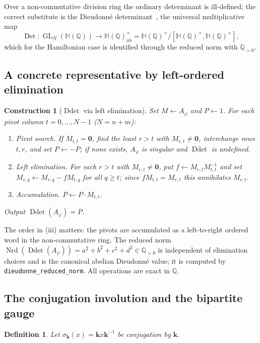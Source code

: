 \documentclass[pdflatex,sn-mathphys-num]{sn-jnl}
\theoremstyle{thmstyleone}%
\newtheorem{construction}[theorem]{Construction}%
\theoremstyle{thmstyletwo}%
\theoremstyle{thmstylethree}%
\newtheorem{definition}{Definition}%
\newcommand{\HH}{\mathbb{H}}
\newcommand{\QQ}{\mathbb{Q}}
\newcommand{\Nrd}{\operatorname{Nrd}}
\newcommand{\Ddet}{\operatorname{Ddet}}
\newcommand{\Det}{\operatorname{Det}}
\newcommand{\bk}{\mathbf{k}}
\newcommand{\Aphi}{A_{\varphi}}
\DeclareMathOperator{\GL}{GL}
\begin{document}
Over a non-commutative division ring the ordinary determinant is
ill-defined; the correct substitute is the Dieudonn\'e
determinant~\cite{Dieudonne}, the universal multiplicative map
\[
  \Det:\GL_N(\HH(\QQ))\longrightarrow
       \HH(\QQ)^{\times}_{\mathrm{ab}}
       =\HH(\QQ)^{\times}\big/[\HH(\QQ)^{\times},\HH(\QQ)^{\times}],
\]
which for the Hamiltonian case is identified through the reduced norm with
$\QQ_{>0}$.

\subsection{A concrete representative by left-ordered elimination}

\begin{construction}[$\Ddet$ via left elimination]\label{con:ddet}
Set $M\gets\Aphi$ and $P\gets1$. For each pivot column $t=0,\dots,N-1$
($N=n+m$):
\begin{enumerate}[label=\textup{(\roman*)}]
\item \emph{Pivot search.} If $M_{t,t}=\mathbf0$, find the least $r>t$ with
$M_{r,t}\neq\mathbf0$, interchange rows $t,r$, and set $P\gets-P$; if none
exists, $\Aphi$ is singular and $\Ddet$ is undefined.
\item \emph{Left elimination.} For each $r>t$ with $M_{r,t}\neq\mathbf0$,
put $f\gets M_{r,t}M_{t,t}^{-1}$ and set
$M_{r,q}\gets M_{r,q}-fM_{t,q}$ for all $q\ge t$; since $fM_{t,t}=M_{r,t}$
this annihilates $M_{r,t}$.
\item \emph{Accumulation.} $P\gets P\cdot M_{t,t}$.
\end{enumerate}
Output $\Ddet(\Aphi)=P$.
\end{construction}

The order in (iii) matters: the pivots are accumulated as a left-to-right
ordered word in the non-commutative ring. The reduced norm
$\Nrd(\Ddet(\Aphi))=a^2+b^2+c^2+d^2\in\QQ_{>0}$ is independent of
elimination choices and is the canonical abelian Dieudonn\'e value; it is
computed by \texttt{dieudonne\_reduced\_norm}. All operations are exact in
$\QQ$.

\subsection{The conjugation involution and the bipartite gauge}

\begin{definition}\label{def:sigma}
Let $\sigma_{\bk}(x)=\bk x\bk^{-1}$ be conjugation by $\bk$.
\end{definition}
\end{document}
